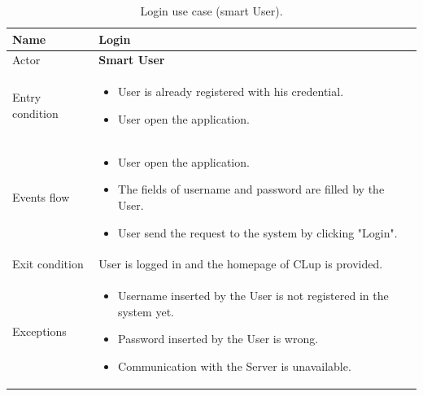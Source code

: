 \pagebreak

\begin{table}[H]\begin{tabular}{|p{5cm} | p{7cm} | }
\hline
Name & \textbf{Login} \\
\hline
Actor & \textbf{Smart User} \\
\hline
Entry condition &
\begin{itemize}
\item User is already registered with his credential. 
\item User open the application.
\end{itemize} \\
\hline
Events flow & 
\begin{itemize}
	\item User open the application.
	\item The fields of username and password are filled by the User. 
	\item User send the request to the system by clicking "Login".
\end{itemize} \\
\hline
Exit condition & User is logged in and the homepage of CLup is provided. \\
\hline 
Exceptions &
\begin{itemize}
	\item Username inserted by the User is not registered in the system yet.
	\item Password inserted by the User is wrong.
    \item Communication with the Server is unavailable.
\end{itemize} \\
\hline
\end{tabular}

\caption{Login use case (smart User).}

\end{table}

